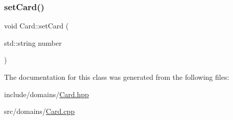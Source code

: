 \mbox{\label{class_card_a97571980a043fd28f4a3fc8211d1cae8}} 
\subsubsection{\texorpdfstring{setCard()}{setCard()}}
{\footnotesize\ttfamily void Card\+::set\+Card (\begin{DoxyParamCaption}\item[{std\+::string}]{number }\end{DoxyParamCaption})}



The documentation for this class was generated from the following files\+:\begin{DoxyCompactItemize}
\item 
include/domains/\mbox{\hyperlink{_card_8hpp}{Card.\+hpp}}\item 
src/domains/\mbox{\hyperlink{_card_8cpp}{Card.\+cpp}}\end{DoxyCompactItemize}
